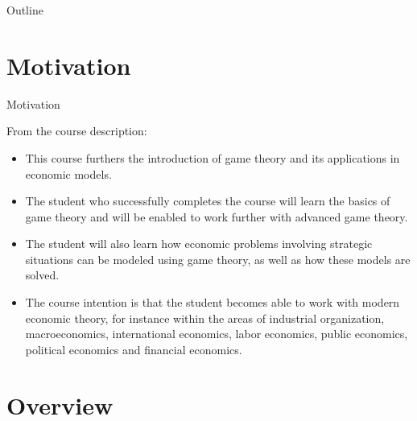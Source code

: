


\maketitle


\begin{frame}{Outline}
\tableofcontents
\end{frame}


\section{Motivation}

\begin{frame}{Motivation}
\begin{multicols}{2}
From the course description:
\begin{itemize}
  \item[1.] This course furthers the introduction of game theory and its applications in economic models.
  \item[2.] The student who successfully completes the course will learn the basics of game theory and will be enabled to work further with advanced game theory.
\end{itemize}
\columnbreak
\begin{itemize}
  \item[3.] The student will also learn how economic problems involving strategic situations can be modeled using game theory, as well as how these models are solved.
  \item[4.] The course intention is that the student becomes able to work with modern economic theory, for instance within the areas of industrial organization, macroeconomics, international economics, labor economics, public economics, political economics and financial economics.
\end{itemize}
\end{multicols}
\end{frame}


\section{Overview}

